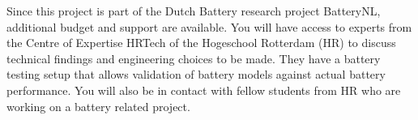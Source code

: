 Since this project is part of the Dutch Battery research project BatteryNL,
additional budget and support are available. You will have access to experts
from the Centre of Expertise HRTech of the Hogeschool Rotterdam (HR) to
discuss technical findings and engineering choices to be made. They have a
battery testing setup that allows validation of battery models against actual
battery performance. You will also be in contact with fellow students from
HR who are working on a battery related project.